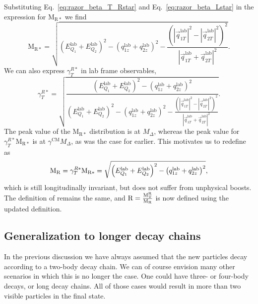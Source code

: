 Substituting Eq.~\ref{eq:razor_beta_T_Rstar} and Eq.~\ref{eq:razor_beta_Lstar} in the expression for
$\mathrm{M_{R*}}$ we find
\begin{equation}
  \mathrm{M_{R*}} = \sqrt{\left( E_{Q_1}^{\textrm{lab}} + E_{Q_2}^{\textrm{lab}}\right)^2 
                        - \left( q_{1z}^{\textrm{lab}} + q_{2z}^{\textrm{lab}} \right)^2 
                        - \frac{(|\vec{q}_{1T}^{\textrm{lab}}|^2 -
|\vec{q}_{2T}^{\textrm{lab}}|^2 )^2}{|\vec{q}_{1T}^{\textrm{lab}} +
\vec{q}_{2T}^{\textrm{lab}}|^2} } .
\end{equation}
We can also express $\gamma_T^{R*}$ in lab frame observables,
\begin{equation}
  \gamma_T^{R*} = \sqrt{ \frac{\left( E_{Q_1}^{\textrm{lab}} + E_{Q_2}^{\textrm{lab}}\right)^2 
                        - \left( q_{1z}^{\textrm{lab}} + q_{2z}^{\textrm{lab}} \right)^2 }
                              {\left( E_{Q_1}^{\textrm{lab}} + E_{Q_2}^{\textrm{lab}}\right)^2 
                        - \left( q_{1z}^{\textrm{lab}} + q_{2z}^{\textrm{lab}} \right)^2 
                        - \frac{(|\vec{q}_{1T}^{\textrm{lab}}|^2 -
|\vec{q}_{2T}^{\textrm{lab}}|^2 )^2}{|\vec{q}_{1T}^{\textrm{lab}} +
\vec{q}_{2T}^{\textrm{lab}}|^2}}} . 
\end{equation}
The peak value of the $\mathrm{M_{R*}}$ distribution is at $M_\Delta$, whereas the peak value for
$\gamma_T^{R*}\mathrm{M_{R*}}$ is at $\gamma^{\textrm{CM}}M_\Delta$, as was the case for \mr
earlier. This motivates us to redefine \mr as
\begin{equation}
  \mathrm{M_R} = \gamma_T^{R*}\mathrm{M_{R*}} = \sqrt{\left( E_{Q_1}^{\textrm{lab}} +
E_{Q_2}^{\textrm{lab}}\right)^2 - \left( q_{1z}^{\textrm{lab}} +
q_{2z}^{\textrm{lab}} \right)^2} ,
\end{equation}
which is still longitudinally invariant, but does not suffer from unphysical boosts.
The definition of \mtr remains the same, and $\mathrm{R} = \frac{\mathrm{M_T^R}}{\mathrm{M_R}}$ is now defined using
the updated \mr definition.

\subsection{Generalization to longer decay chains \label{sec:razor_megajet_algorithm}}

In the previous discussion we have always assumed that the new particles decay according to a
two-body decay chain. We can of course envision many other scenarios in which this is no longer the
case. One could have three- or four-body decays, or long decay chains. All of those cases would
result in more than two visible particles in the final state. 

